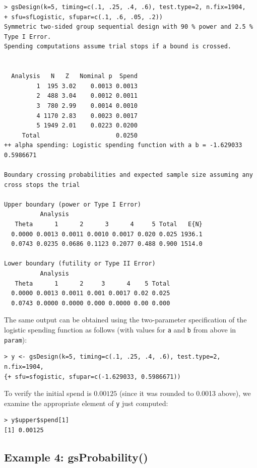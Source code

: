 \bigskip
\begin{verbatim}
> gsDesign(k=5, timing=c(.1, .25, .4, .6), test.type=2, n.fix=1904,
+ sfu=sfLogistic, sfupar=c(.1, .6, .05, .2))
Symmetric two-sided group sequential design with 90 % power and 2.5 % Type I Error.
Spending computations assume trial stops if a bound is crossed.

               
  Analysis   N   Z   Nominal p  Spend
         1  195 3.02    0.0013 0.0013
         2  488 3.04    0.0012 0.0011
         3  780 2.99    0.0014 0.0010
         4 1170 2.83    0.0023 0.0017
         5 1949 2.01    0.0223 0.0200
     Total                     0.0250 
++ alpha spending: Logistic spending function with a b = -1.629033 0.5986671

Boundary crossing probabilities and expected sample size assuming any cross stops the trial

Upper boundary (power or Type I Error)
          Analysis
   Theta      1      2      3      4     5 Total   E{N}
  0.0000 0.0013 0.0011 0.0010 0.0017 0.020 0.025 1936.1
  0.0743 0.0235 0.0686 0.1123 0.2077 0.488 0.900 1514.0

Lower boundary (futility or Type II Error)
          Analysis
   Theta      1      2     3      4    5 Total
  0.0000 0.0013 0.0011 0.001 0.0017 0.02 0.025
  0.0743 0.0000 0.0000 0.000 0.0000 0.00 0.000
\end{verbatim}
\bigskip

The same output can be obtained using the two-parameter specification of the
logistic spending function as follows (with values for \texttt{a} and 
\texttt{b} from above in \texttt{param}):

\bigskip

\begin{verbatim}
> y <- gsDesign(k=5, timing=c(.1, .25, .4, .6), test.type=2, n.fix=1904,
{+ sfu=sfogistic, sfupar=c(-1.629033, 0.5986671))
\end{verbatim}
\bigskip

To verify the initial spend is $0.00125$ (since it was rounded to 0.0013 above),
we examine the appropriate element of \texttt{y} just computed:

\bigskip

\begin{verbatim}
> y$upper$spend[1]
[1] 0.00125
\end{verbatim}


\subsection*{Example 4: gsProbability()}


